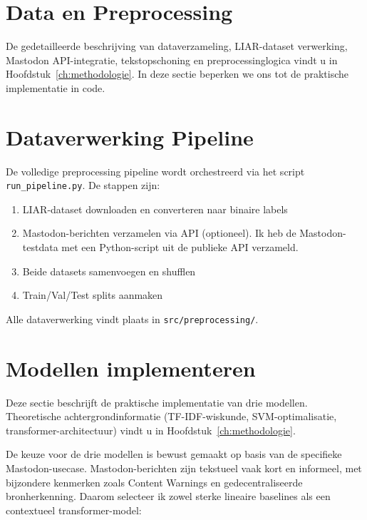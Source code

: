 \section{Data en Preprocessing}
\label{sec:data-preprocessing}

De gedetailleerde beschrijving van dataverzameling, LIAR-dataset verwerking,
Mastodon API-integratie, tekstopschoning en preprocessinglogica vindt u in
Hoofdstuk~\ref{ch:methodologie}. In deze sectie beperken we ons tot de
praktische implementatie in code.

\section{Dataverwerking Pipeline}

De volledige preprocessing pipeline wordt orchestreerd via het script
\texttt{run\_pipeline.py}. De stappen zijn:

\begin{enumerate}
    \item LIAR-dataset downloaden en converteren naar binaire labels
    \item Mastodon-berichten verzamelen via API (optioneel). Ik heb de Mastodon-testdata met een Python-script uit de publieke API verzameld.
    \item Beide datasets samenvoegen en shufflen
    \item Train/Val/Test splits aanmaken
\end{enumerate}

Alle dataverwerking vindt plaats in \texttt{src/preprocessing/}.

\section{Modellen implementeren}
\label{sec:modellen}

Deze sectie beschrijft de praktische implementatie van drie modellen.
Theoretische achtergrondinformatie (TF-IDF-wiskunde, SVM-optimalisatie,
transformer-architectuur) vindt u in Hoofdstuk~\ref{ch:methodologie}.

De keuze voor de drie modellen is bewust gemaakt op basis van de specifieke
Mastodon-usecase. Mastodon-berichten zijn tekstueel vaak kort en informeel,
met bijzondere kenmerken zoals Content Warnings en gedecentraliseerde bronherkenning.
Daarom selecteer ik zowel sterke lineaire baselines als een contextueel
transformer-model:

